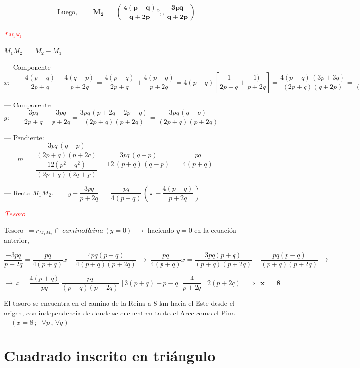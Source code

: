 $$\text{Luego, } \qquad \boldsymbol{ M_2 \ = \ \left( \, \dfrac{4(p-q)}{q+2p} º, , \, \dfrac{3pq}{q+2p} \, \right) } $$


\vspace{5mm} \textcolor{red}{$\boxed{\ r_{M_1M_2} \ }$}

$\overrightarrow{M_1M_2}\ = \ M_2-M_1$

--- Componente $x:\qquad \dfrac{4(p-q)}{2p+q}-\dfrac{4(q-p)}{p+2q}=
\dfrac{4(p-q)}{2p+q}+\dfrac{4(p-q)}{p+2q}=
4(p-q)\, \left[ \dfrac{1}{2p+q}+\dfrac{1)}{p+2q} \right]=
\dfrac{4(p-q)\, (3p+3q)}{(2p+q)(q+2p)}=
\dfrac{12(p^2-q^2)}{(2p+q)(2q+p)}$

--- Componente $y: \qquad \dfrac{3pq}{2p+q}-\dfrac{3pq}{p+2q}=\dfrac{3pq\, (p+2q-2p-q)}{(2p+q)(p+2q)}=\dfrac{3pq\, (q-p)}{(2p+q)(p+2q)}$

--- Pendiente: $\qquad  m \ = \ 
\dfrac {\dfrac{3pq\, (q-p)}{(2p+q)(p+2q)}} {\dfrac{12(p^2-q^2)}{(2p+q)(2q+p)}} =
\dfrac{3pq\, (q-p)}{12\, (p+q)\, (q-p)} \ = \ \dfrac{pq}{4(p+q)}$

--- Recta $M_1M_2:\qquad y-\dfrac{3pq}{p+2q} \ = \ \dfrac{pq}{4(p+q)}\, \left( \, x-\dfrac{4(p-q)}{p+2q}\, \right)$

\vspace{5mm} \textcolor{red}{$\boxed{\ Tesoro \ }$}

Tesoro $\, = r_{M_1M_2} \, \cap \, caminoReina \, (y=0)\ \ \to $ haciendo $y=0$ en la ecuación anterior,

$\dfrac{-3pq}{p+2q}=\dfrac{pq}{4(p+q)} x -\dfrac{4pq(p-q)}{4(p+q)(p+2q)} \ \to \ 
\dfrac{pq}{4(p+q)} x=\dfrac{3pq(p+q)}{(p+q)(p+2q)}-\dfrac{pq(p-q)}{(p+q)(p+2q)} \ \to \ $

$\to \ x=\dfrac{4(p+q)}{pq}\, \dfrac{pq}{(p+q)(p+2q)}\, \left[ 3(p+q)+p-q  \right]\dfrac{4}{p+2q}\, [2(p+2q)] \ \Rightarrow \ \boldsymbol{ \boxed{ \ x \ = \ 8 \ } }$


\vspace{5mm}\textsf{El tesoro se encuentra en el camino de la Reina a $8$ km hacia el Este desde el origen, con independencia de donde se encuentren tanto el Arce como el Pino} \textcolor{gris}{$\quad (x=8\, ; \ \ \ \forall p\, , \ \forall q)$}



\chapter{Cuadrado inscrito en triángulo}\label{cuadradoentriangulo}

\vspace{10mm}

